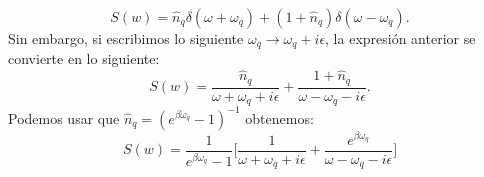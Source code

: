 \begin{equation}
    S(w) = \hat{n}_{q} \delta (\omega + \omega_q) + \left( 1+ \hat{n}_{q} \right) \delta (\omega - \omega_{q}).
\end{equation}
Sin embargo, si escribimos lo siguiente $\omega_{q} \longrightarrow \omega_{q} + i\epsilon$, la expresión anterior se convierte en lo siguiente:
\begin{equation}
    S(w) = \frac{\hat{n}_{q}}{\omega + \omega_q + i\epsilon } + \frac{1+\hat{n}_{q}}{\omega-\omega_q - i\epsilon}.  
\end{equation}
Podemos usar que $\hat{n}_{q} = \left( e^{\beta \omega_q} -1 \right)^{-1}$ obtenemos:
\begin{equation}
    S(w) = \frac{1}{e^{\beta \omega_q} -1} \big[ \frac{1}{\omega + \omega_q + i\epsilon } + \frac{e^{\beta \omega_q}}{\omega-\omega_q - i\epsilon}\big]
\end{equation}